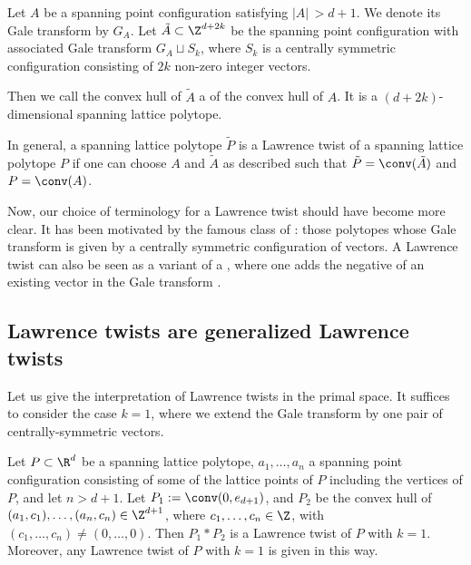 \documentclass[reqno, 11pt, a4paper, oneside]{amsart}
\begin{document}
 
\begin{dfn}
 Let $A$ be a spanning point configuration satisfying $|A|\, > d+1$. We denote its Gale transform by $G_A$. Let $\tilde{A} \subset \Z^{d+2k}$ be the spanning point configuration with associated Gale transform $G_A \sqcup S_k$, where $S_k$ is a centrally symmetric configuration consisting of $ 2 k $ non-zero integer vectors.

  Then we call the convex hull of $
  \tilde{A}$ a  of the convex hull of $A$.  
  It is a $(d+2k)$-dimensional spanning lattice polytope.

  In general, a spanning lattice polytope $\tilde{P}$ is a Lawrence twist of a spanning lattice polytope $P$ if one can choose $A$ and $\tilde{A}$ as described such that $\tilde{P} = \conv(\tilde{A})$ and $P = \conv(A)$. 
  \label{def-lawrence}
\end{dfn}

Now, our choice of terminology for a Lawrence twist should have become more clear. It has been motivated by the famous class of  \cite{bayer_lawrence_1990}: those polytopes whose Gale transform is given by a centrally symmetric configuration of vectors. A Lawrence twist can also be seen as a variant of a , where one adds the negative of an existing vector in the Gale transform \cite[Section~5.5]{de_loera_triangulations_2010}. 

\subsection{Lawrence twists are generalized Lawrence twists}

Let us give the interpretation of Lawrence twists in the primal space. It suffices to consider the case $k=1$, where we extend the Gale transform by one pair of centrally-symmetric vectors.


\begin{prop}
Let $P \subset \R^d$ be a spanning lattice polytope, $a_1, \ldots, a_n$ a spanning point configuration consisting of some of the lattice points of $P$ including the vertices of $P$, and let $n > d+1$. Let $P_1 := \conv(0,e_{d+1})$, and $P_2$ be the convex hull of $(a_1, c_1), \ldots, (a_n, c_n) \in \Z^{d+1}$, where $c_1, \ldots, c_n \in \Z$, with $(c_1, \ldots, c_n) \not= (0,\ldots,0)$. Then $P_1*P_2$ is a Lawrence twist of $P$ with $k=1$. Moreover, any Lawrence twist of $P$ with $k=1$ is given in this way.
\label{prop:lawrence}
\end{prop}
\end{document}

